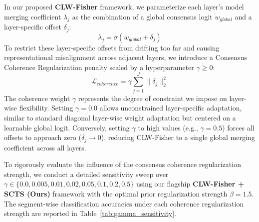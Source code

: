 \documentclass{article}
\theoremstyle{plain}
\theoremstyle{definition}
\theoremstyle{remark}
\begin{document}
In our proposed \textbf{CLW-Fisher} framework, we parameterize each layer's model merging coefficient $\lambda_j$ as the combination of a global consensus logit $w_{global}$ and a layer-specific offset $\delta_j$:
\begin{equation}
  \lambda_j = \sigma\left(w_{global} + \delta_j\right)
\end{equation}
To restrict these layer-specific offsets from drifting too far and causing representational misalignment across adjacent layers, we introduce a Consensus Coherence Regularization penalty scaled by a hyperparameter $\gamma \ge 0$:
\begin{equation}
  \mathcal{L}_{coherence} = \gamma \sum_{j=1}^J \|\delta_j\|_2^2
\end{equation}
The coherence weight $\gamma$ represents the degree of constraint we impose on layer-wise flexibility. Setting $\gamma = 0.0$ allows unconstrained layer-specific adaptation, similar to standard diagonal layer-wise weight adaptation but centered on a learnable global logit. Conversely, setting $\gamma$ to high values (e.g., $\gamma = 0.5$) forces all offsets to approach zero ($\delta_j \to 0$), reducing CLW-Fisher to a single global merging coefficient across all layers.

To rigorously evaluate the influence of the consensus coherence regularization strength, we conduct a detailed sensitivity sweep over $\gamma \in \{0.0, 0.005, 0.01, 0.02, 0.05, 0.1, 0.2, 0.5\}$ using our flagship \textbf{CLW-Fisher + SCTS (Ours)} framework with the optimal prior regularization strength $\beta = 1.5$. The segment-wise classification accuracies under each coherence regularization strength are reported in Table~\ref{tab:gamma_sensitivity}.
\end{document}
